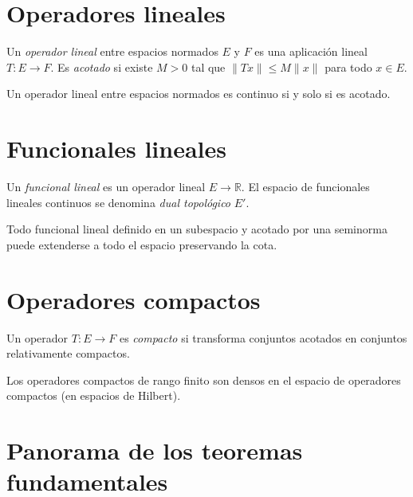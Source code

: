\section{Operadores lineales}

\begin{definition}
\label{def:operador}
Un \emph{operador lineal} entre espacios normados $E$ y $F$ es una aplicación lineal $T\colon E\to F$. Es \emph{acotado} si existe $M>0$ tal que $\|Tx\|\leq M\|x\|$ para todo $x\in E$.
\end{definition}

\begin{theorem}
\label{teo:continuo-acotado}
Un operador lineal entre espacios normados es continuo si y solo si es acotado.
\end{theorem}

\section{Funcionales lineales}

\begin{definition}
\label{def:functional}
Un \emph{funcional lineal} es un operador lineal $E\to\mathbb{R}$. El espacio de funcionales lineales continuos se denomina \emph{dual topológico} $E'$.
\end{definition}

\begin{theorem}
\label{teo:hahn-banach}
Todo funcional lineal definido en un subespacio y acotado por una seminorma puede extenderse a todo el espacio preservando la cota.
\end{theorem}

\section{Operadores compactos}

\begin{definition}
\label{def:operador-compacto}
Un operador $T\colon E\to F$ es \emph{compacto} si transforma conjuntos acotados en conjuntos relativamente compactos.
\end{definition}

\begin{theorem}
\label{teo:compacidad-rango}
Los operadores compactos de rango finito son densos en el espacio de operadores compactos (en espacios de Hilbert).
\end{theorem}

\section{Panorama de los teoremas fundamentales}

